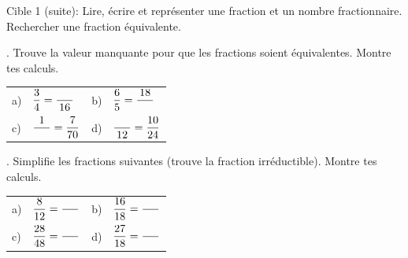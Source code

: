\documentclass[11pt]{article}
\begin{document}
\begin{cible}{Cible 1 (suite): Lire, écrire et représenter une fraction et un nombre fractionnaire. Rechercher une fraction équivalente.}

  \vspace{5mm}
  . Trouve la valeur manquante pour que les fractions soient équivalentes. Montre tes calculs.

  \vspace{5mm}

  \begin{tabular}{@{}p{0.5cm}p{6cm}p{0.5cm}p{6cm}@{}}
    a) & $\dfrac{3}{4}= \dfrac{\hspace{5mm}}{16}$ & b) & $\dfrac{6}{5}= \dfrac{18}{\hspace{5mm}}$   \\[10mm]
    c) & $\dfrac{1}{\hspace{5mm}}= \dfrac{7}{70}$ & d) & $\dfrac{\hspace{5mm}}{12}= \dfrac{10}{24}$ \\[4mm]
  \end{tabular}

  \vspace{10mm}


  . Simplifie les fractions suivantes (trouve la fraction irréductible). Montre tes calculs. 

  \vspace{5mm}

  \begin{tabular}{@{}p{0.5cm}p{6cm}p{0.5cm}p{6cm}@{}}
    a) & $\dfrac{8}{12}= \dfrac{\hspace{5mm}}{\hspace{5mm}}$  & b) & $\dfrac{16}{18}= \dfrac{\hspace{5mm}}{\hspace{5mm}}$ \\[10mm]
    c) & $\dfrac{28}{48}= \dfrac{\hspace{5mm}}{\hspace{5mm}}$ & d) & $\dfrac{27}{18}= \dfrac{\hspace{5mm}}{\hspace{5mm}}$ \\[4mm]
  \end{tabular}

  \vspace{10mm}

\end{cible}
\end{document}
